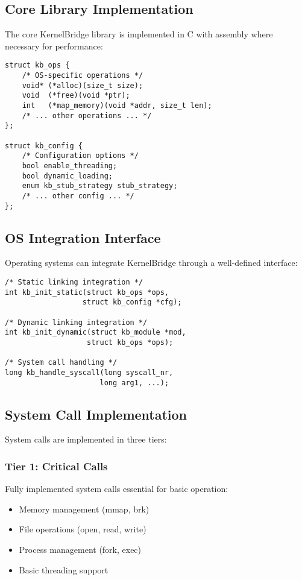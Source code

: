 \documentclass[conference]{IEEEtran}
\begin{document}
\subsection{Core Library Implementation}
The core KernelBridge library is implemented in C with assembly where necessary for performance:

\begin{verbatim}
struct kb_ops {
    /* OS-specific operations */
    void* (*alloc)(size_t size);
    void  (*free)(void *ptr);
    int   (*map_memory)(void *addr, size_t len);
    /* ... other operations ... */
};

struct kb_config {
    /* Configuration options */
    bool enable_threading;
    bool dynamic_loading;
    enum kb_stub_strategy stub_strategy;
    /* ... other config ... */
};
\end{verbatim}

\subsection{OS Integration Interface}
Operating systems can integrate KernelBridge through a well-defined interface:

\begin{verbatim}
/* Static linking integration */
int kb_init_static(struct kb_ops *ops, 
                  struct kb_config *cfg);

/* Dynamic linking integration */
int kb_init_dynamic(struct kb_module *mod,
                   struct kb_ops *ops);

/* System call handling */
long kb_handle_syscall(long syscall_nr,
                      long arg1, ...);
\end{verbatim}

\subsection{System Call Implementation}
System calls are implemented in three tiers:

\subsubsection{Tier 1: Critical Calls}
Fully implemented system calls essential for basic operation:
\begin{itemize}
	\item Memory management (mmap, brk)
	\item File operations (open, read, write)
	\item Process management (fork, exec)
	\item Basic threading support
\end{itemize}
\end{document}
